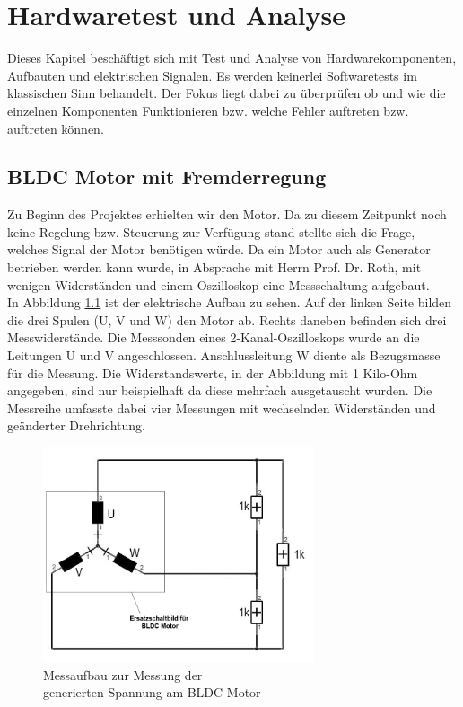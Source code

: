 
\chapter{Hardwaretest und Analyse}
\label{chap:Test_and_Analysis}
Dieses Kapitel beschäftigt sich mit Test und Analyse von Hardwarekomponenten, Aufbauten und elektrischen Signalen.
Es werden keinerlei Softwaretests im klassischen Sinn behandelt.
Der Fokus liegt dabei zu überprüfen ob und wie die einzelnen Komponenten Funktionieren bzw. welche Fehler auftreten bzw. auftreten können.

\section{BLDC Motor mit Fremderregung}
\label{sec:BLDC_mit_Fremderregung}
Zu Beginn des Projektes erhielten wir den Motor.
Da zu diesem Zeitpunkt noch keine Regelung bzw. Steuerung zur Verfügung stand stellte sich die Frage,
welches Signal der Motor benötigen würde.
Da ein Motor auch als Generator betrieben werden kann wurde, in Absprache mit Herrn Prof. Dr. Roth, mit wenigen Widerständen und einem Oszilloskop eine Messschaltung aufgebaut.\\


In Abbildung \ref{fig:BLDC_Fremderregung} ist der elektrische Aufbau zu sehen.
Auf der linken Seite bilden die drei Spulen (U, V und W) den Motor ab.
Rechts daneben befinden sich drei Messwiderstände.
Die Messsonden eines 2-Kanal-Oszilloskops wurde an die Leitungen U und V angeschlossen.
Anschlussleitung W diente als Bezugsmasse für die Messung.
Die Widerstandswerte, in der Abbildung mit 1 Kilo-Ohm angegeben, sind nur beispielhaft da diese mehrfach ausgetauscht wurden.
Die Messreihe umfasste dabei vier Messungen mit wechselnden Widerständen und geänderter Drehrichtung.


\begin{figure}[htbp]
	\centering
	\includegraphics[width=8cm]{tests/graphics/Messchaltung_Fremderregung}
	\caption[Aufbau Spannungsmessung BLDC Motor]{Messaufbau zur Messung der \\generierten Spannung am BLDC Motor}
	\label{fig:BLDC_Fremderregung}
\end{figure}


